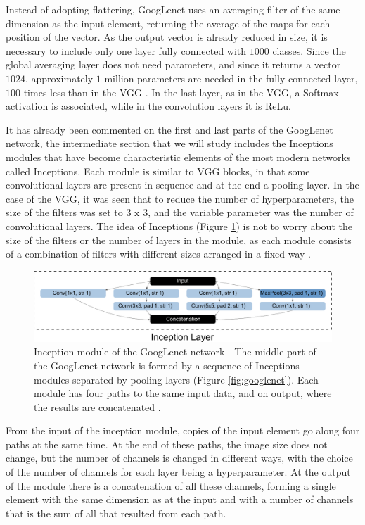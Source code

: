 Instead of adopting flattering, GoogLenet uses an averaging filter of the same dimension as the input element, returning the average of the maps for each position of the vector. As the output vector is already reduced in size, it is necessary to include only one layer fully connected with $1000$ classes. Since the global averaging layer does not need parameters, and since it returns a vector $1024$, approximately $1$ million parameters are needed in the fully connected layer, $100$ times less than in the VGG \cite{johnson2019}. In the last layer, as in the VGG, a Softmax activation is associated, while in the convolution layers it is ReLu.

It has already been commented on the first and last parts of the GoogLenet network, the intermediate section that we will study includes the Inceptions modules that have become characteristic elements of the most modern networks called Inceptions. Each module is similar to VGG blocks, in that some convolutional layers are present in sequence and at the end a pooling layer. In the case of the VGG, it was seen that to reduce the number of hyperparameters, the size of the filters was set to $3\text{ x }3$, and the variable parameter was the number of convolutional layers. The idea of Inceptions (Figure \ref{fig:inceptionmodule}) is not to worry about the size of the filters or the number of layers in the module, as each module consists of a combination of filters with different sizes arranged in a fixed way \cite{elgendy2020}.

\begin{figure}
    \centering
    \includegraphics[scale=0.34]{images/figure133.png}
    \caption{ Inception module of the GoogLenet network - The middle part of the GoogLenet network is formed by a sequence of Inceptions modules separated by pooling layers (Figure \ref{fig:googlenet}). Each module has four paths to the same input data, and on output, where the results are concatenated \cite{zhang2020dive}.}
    \label{fig:inceptionmodule}
\end{figure}

From the input of the inception module, copies of the input element go along four paths at the same time. At the end of these paths, the image size does not change, but the number of channels is changed in different ways, with the choice of the number of channels for each layer being a hyperparameter. At the output of the module there is a concatenation of all these channels, forming a single element with the same dimension as at the input and with a number of channels that is the sum of all that resulted from each path.

